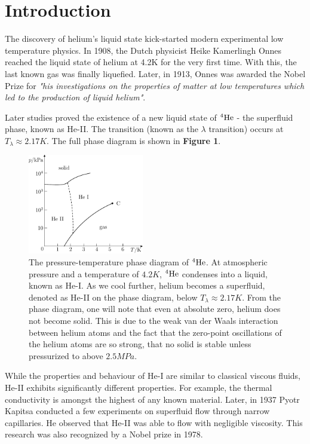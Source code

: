 \chapter*{Introduction}

The discovery of helium's liquid state kick-started modern experimental  low temperature physics. In 1908, the Dutch physicist Heike Kamerlingh Onnes reached the liquid state of helium at 4.2K for the very first time. With this, the last known gas was finally liquefied. Later, in 1913, Onnes was awarded the Nobel Prize for \textit{"his investigations on the properties of matter at low temperatures which led to the production of liquid helium"}.

Later studies proved the existence of a new liquid state of $ {}^4\mathrm{He} $ - the superfluid phase, known as He-II. The transition (known as the $ \lambda$ transition) occurs at $ T_{\lambda} \approx 2.17\unit{K} $. The full phase diagram is shown in {\sffamily\textbf{Figure 1}}.

\begin{figure}[h]
	\centering
	\vspace{0.1cm}
	\includegraphics[width=0.45\textwidth]{graphics/phase_diag}
	\caption{The pressure-temperature phase diagram of ${}^4\mathrm{He}$. At atmospheric pressure and a temperature of $4.2\unit{K}$, ${}^4\mathrm{He}$ condenses into a liquid, known as He-I. As we cool further, helium becomes a superfluid, denoted as He-II on the phase diagram, below $T_{\lambda} \approx 2.17\unit{K}$. From the phase diagram, one will note that even at absolute zero, helium does not become solid. This is due to the weak van der Waals interaction between helium atoms and the fact that the zero-point oscillations of the helium atoms are so strong, that no solid is stable unless pressurized to above $2.5\unit{MPa}$.}
	\vspace{0.5cm}
	\label{phase}
\end{figure}

While the properties and behaviour of He-I are similar to classical viscous fluids, He-II exhibits significantly different properties. For example, the thermal conductivity is amongst the highest of any known material. Later, in 1937 Pyotr Kapitsa\cite{kapitsa} conducted a few experiments on superfluid flow through narrow capillaries. He observed that He-II was able to flow with negligible viscosity. This research was also recognized by a Nobel prize in 1978.


